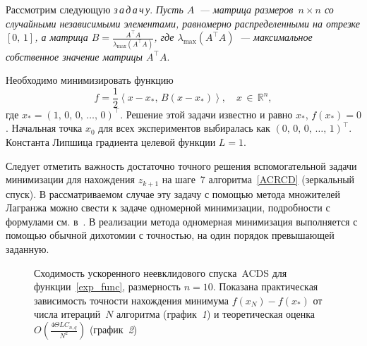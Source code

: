 \documentclass[11pt]{article}
\newcommand{\RR}{\mathbb{R}}
\begin{document}
	Рассмотрим следующую {\sl з\,а\,д\,а\,ч\,у}.
\textit{Пусть $A$~--- матрица размеров~$n \times n$
 со случайными независимыми элементами, равномерно распределенными на отрезке $[0, \, 1]$, а
матрица $B = \frac{A^\top A}{\lambda_{\max}(A^\top A)}$,
где $\lambda_{\max}(A^\top A)$~--- максимальное собственное значение матрицы $A^\top A$}.

Необходимо минимизировать функцию
\begin{equation}
\label{exp_func}
f = \frac{1}{2} \left \langle x - x_*, \, B(x - x_*) \right \rangle, 
\quad x \, \in \, \RR^n,
\end{equation}
где 
$x_* = (1, \, 0, \, 0, \, \ldots, \, 0)^\top$. 
Решение этой задачи известно и равно $x_*$, $f(x_*) = 0$. Начальная точка $x_0$ для всех экспериментов
выбиралась как $(0, \, 0, \, 0, \, \ldots, \, 1)^\top$.
Константа Липшица градиента целевой функции $L = 1$.

Следует отметить важность достаточно точного решения вспомогательной задачи 
	минимизации для нахождения $z_{k+1}$ на шаге~7 алгоритма~\ref{ACRCD} (зеркальный спуск).
В рассматриваемом случае эту задачу с помощью метода
множителей Лагранжа можно свести к 
задаче одномерной минимизации, подробности с формулами
см. в~\cite{git}. В реализации метода одномерная
минимизация выполняется с помощью обычной дихотомии
с точностью, на один порядок превышающей заданную.

			\begin{figure}[htb]
\caption{Сходимость ускоренного неевклидового спуска~ACDS для 
функции~\eqref{exp_func}, размерность $n = 10$. Показана практическая зависимость точности нахождения минимума $f(x_N)- f(x_*)$ от числа итераций~$N$ алгоритма (график~{\it 1}) и теоретическая оценка $O \left (\frac{4\Theta LC_{n,q}}{N^2} \right )$ (график~{\it 2})}
			\label{ris:exp10}
		\end{figure}
\end{document}
